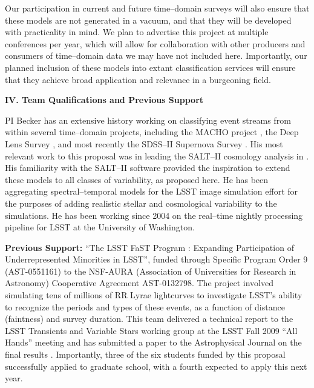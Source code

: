 Our participation in current and future time--domain surveys will also ensure
that these models are not generated in a vacuum, and that they will be developed
with practicality in mind.  We plan to advertise this project at multiple
conferences per year, which will allow for collaboration with other producers
and consumers of time--domain data we may have not included here. Importantly,
our planned inclusion of these models into extant classification services will
ensure that they achieve broad application and relevance in a burgeoning field.


\bigskip \centerline{\bf IV. Team Qualifications and Previous Support}
\smallskip

 \smallskip

PI Becker has an extensive history working on classifying event streams from
within several time--domain projects, including the MACHO project
\citep{2000PhDT.......258B}, the Deep Lens Survey \citep{2004ApJ...611..418B},
and most recently the SDSS--II Supernova Survey
\citep{2008AJ....135..338F,2008AJ....135..348S}.  His most relevant work to this
proposal was in leading the SALT--II cosmology analysis in
\cite{2009ApJS..185...32K}.  His familiarity with the SALT--II software provided
the inspiration to extend these models to all classes of variability, as
proposed here. He has been aggregating spectral--temporal models for the LSST
image simulation effort \citep{2010SPIE.7738E..53C} for the purposes of adding
realistic stellar and cosmological variability to the simulations.  He has been
working since 2004 on the real--time nightly processing pipeline for LSST at the
University of Washington.

{\bf Previous Support:} ``The LSST FaST Program : Expanding Participation of
Underrepresented Minorities in LSST'', funded through Specific Program Order 9
(AST-0551161) to the NSF-AURA (Association of Universities for Research in
Astronomy) Cooperative Agreement AST-0132798.  The project involved simulating
tens of millions of RR Lyrae lightcurves to investigate LSST's ability to
recognize the periods and types of these events, as a function of distance
(faintness) and survey duration.  This team delivered a technical report to the
LSST Transients and Variable Stars working group at the LSST Fall 2009 ``All
Hands'' meeting and has submitted a paper to the Astrophysical Journal on the
final results \citep{RRLyrae}. Importantly, three of the six students funded by
this proposal successfully applied to graduate school, with a fourth expected to
apply this next year.

